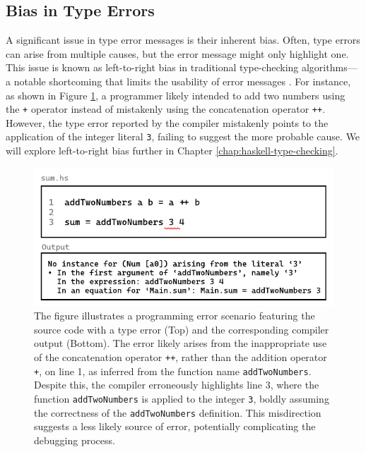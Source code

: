  \subsection{Bias in Type Errors} 
 \label{subsec:bias}
 
A significant issue in type error messages is their inherent bias. Often, type errors can arise from multiple causes, but the error message might only highlight one. This issue is known as left-to-right bias in traditional type-checking algorithms—a notable shortcoming that limits the usability of error messages \cite{McAdam2002-vb, Lee1998-fx, Chen2014-ev}.  For instance, as shown in Figure \ref{fig:type-error-example}, a programmer likely intended to add two numbers using the \texttt{+} operator instead of mistakenly using the concatenation operator \texttt{++}. However, the type error reported by the compiler mistakenly points to the application of the integer literal \texttt{3}, failing to suggest the more probable cause. We will explore left-to-right bias further in Chapter \ref{chap:haskell-type-checking}.

 \begin{figure}[htbp]
  \centering
  \includegraphics[width=\linewidth]{TypeErrorExample}
  \caption[Illustrating a programming error in Haskell, featuring a function named \texttt{addTwoNumbers} with a type error and the corresponding compiler output]{
    \label{fig:type-error-example}
    The figure illustrates a programming error scenario featuring the source code with a type error (Top) and the corresponding compiler output (Bottom). The error likely arises from the inappropriate use of the concatenation operator \texttt{++}, rather than the addition operator \texttt{+}, on line 1, as inferred from the function name \texttt{addTwoNumbers}. Despite this, the compiler erroneously highlights line 3, where the function \texttt{addTwoNumbers} is applied to the integer \texttt{3}, boldly assuming the correctness of the \texttt{addTwoNumbers} definition. This misdirection suggests a less likely source of error, potentially complicating the debugging process.
    }
\end{figure}


